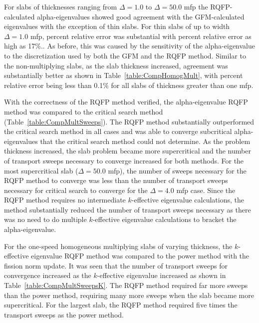 For slabs of thicknesses ranging from $\Delta = 1.0$ to $\Delta = 50.0$ mfp the RQFP-calculated alpha-eigenvalues showed good agreement with the GFM-calculated eigenvalues with the exception of thin slabs. For thin slabs of up to width $\Delta = 1.0$ mfp, percent relative error was substantial with percent relative error as high as 17\%.. As before, this was caused by the sensitivity of the alpha-eigenvalue to the discretization used by both the GFM and the RQFP method. Similar to the non-multiplying slabs, as the slab thickness increased, agreement was substantially better as shown in Table~\ref{table:CompHomogMult}, with percent relative error being less than 0.1\% for all slabs of thickness greater than one mfp. 

With the correctness of the RQFP method verified, the alpha-eigenvalue RQFP method was compared to the critical search method (Table~\ref{table:CompMultSweeps}). The RQFP method substantially outperformed the critical search method in all cases and was able to converge subcritical alpha-eigenvalues that the critical search method could not determine. As the problem thickness increased, the slab problem became more supercritical and the number of transport sweeps necessary to converge increased for both methods. For the most supercritical slab ($\Delta = 50.0$ mfp), the number of sweeps necessary for the RQFP method to converge was less than the number of transport sweeps necessary for critical search to converge for the $\Delta = 4.0$ mfp case. Since the RQFP method requires no intermediate $k$-effective eigenvalue calculations, the method substantially reduced the number of transport sweeps necessary as there was no need to do multiple $k$-effective eigenvalue calculations to bracket the alpha-eigenvalue.

For the one-speed homogeneous multiplying slabs of varying thickness, the $k$-effective eigenvalue RQFP method was compared to the power method with the fission norm update. It was seen that the number of transport sweeps for convergence increased as the $k$-effective eigenvalue increased as shown in Table~\ref{table:CompMultSweepsK}. The RQFP method required far more sweeps than the power method, requiring many more sweeps when the slab became more supercritical. For the largest slab, the RQFP method required five times the transport sweeps as the power method.

